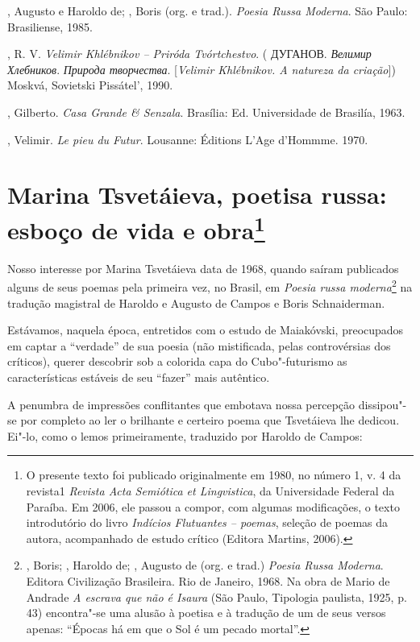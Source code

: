 , Augusto e Haroldo de; , Boris (org. e trad.).
\emph{Poesia Russa Moderna}. São Paulo: Brasiliense, 1985.

, R. V. \emph{Velimir Khlébnikov -- Priróda Tvórtchestvo}. (
ДУГАНОВ. \emph{Велимир Хлебников}. \emph{Природа творчества}.
[\emph{Velimir Khlébnikov. A natureza da criação}]) Moskvá,
Sovietski Pissátel', 1990.

, Gilberto. \emph{Casa Grande \& Senzala}. Brasília: Ed.
Universidade de Brasilía, 1963.

, Velimir. \emph{Le pieu du Futur}. Lousanne: Éditions L'Age
d'Hommme. 1970.

\chapter{Marina Tsvetáieva, poetisa russa: esboço de vida e
obra\footnote{O presente texto foi publicado originalmente em 1980, no
  número 1, v. 4 da revista1 \emph{Revista Acta Semiótica et
  Lingvistica}, da Universidade Federal da Paraíba. Em 2006, ele passou
  a compor, com algumas modificações, o texto introdutório do livro
  \emph{Indícios Flutuantes -- poemas}, seleção de poemas da autora,
  acompanhado de estudo crítico (Editora Martins, 2006).}}


Nosso interesse por Marina Tsvetáieva data de 1968, quando saíram
publicados alguns de seus poemas pela primeira vez, no Brasil, em
\emph{Poesia russa moderna}\footnote{, Boris; ,
  Haroldo de; , Augusto de (org. e trad.) \emph{Poesia Russa Moderna}.
  Editora Civilização Brasileira. Rio de Janeiro, 1968. Na obra de Mario
  de Andrade \emph{A escrava que não é Isaura} (São Paulo, Tipologia
  paulista, 1925, p. 43) encontra"-se uma alusão à poetisa e à tradução
  de um de seus versos apenas: ``Épocas há em que o Sol é um pecado
  mortal''.} na tradução magistral de Haroldo e Augusto de Campos e
Boris Schnaiderman.

Estávamos, naquela época, entretidos com o estudo de Maiakóvski,
preocupados em captar a ``verdade'' de sua poesia (não mistificada,
pelas controvérsias dos críticos), querer descobrir sob a colorida capa
do Cubo"-futurismo as características estáveis de seu ``fazer'' mais
autêntico.

A penumbra de impressões conflitantes que embotava nossa percepção
dissipou"-se por completo ao ler o brilhante e certeiro poema que
Tsvetáieva lhe dedicou. Ei"-lo, como o lemos primeiramente, traduzido por
Haroldo de Campos:

